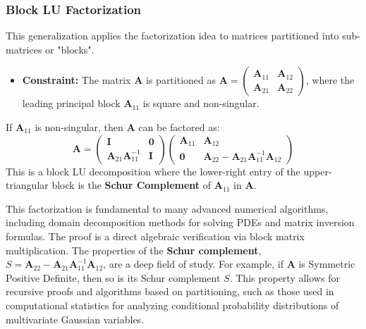 \subsubsection{Block LU Factorization}
This generalization applies the factorization idea to matrices partitioned into sub-matrices or "blocks".

\begin{itemize}
    \item \textbf{Constraint:} The matrix $\mathbf{A}$ is partitioned as $\mathbf{A} = \begin{pmatrix} \mathbf{A}_{11} & \mathbf{A}_{12} \\ \mathbf{A}_{21} & \mathbf{A}_{22} \end{pmatrix}$, where the leading principal block $\mathbf{A}_{11}$ is square and non-singular.
\end{itemize}

\begin{theorem}
If $\mathbf{A}_{11}$ is non-singular, then $\mathbf{A}$ can be factored as:
\[ \mathbf{A} = 
\begin{pmatrix} \mathbf{I} & \mathbf{0} \\ \mathbf{A}_{21}\mathbf{A}_{11}^{-1} & \mathbf{I} \end{pmatrix}
\begin{pmatrix} \mathbf{A}_{11} & \mathbf{A}_{12} \\ \mathbf{0} & \mathbf{A}_{22} - \mathbf{A}_{21}\mathbf{A}_{11}^{-1}\mathbf{A}_{12} \end{pmatrix}
\]
This is a block LU decomposition where the lower-right entry of the upper-triangular block is the \textbf{Schur Complement} of $\mathbf{A}_{11}$ in $\mathbf{A}$.
\end{theorem}

\begin{remark}
This factorization is fundamental to many advanced numerical algorithms, including domain decomposition methods for solving PDEs and matrix inversion formulas. The proof is a direct algebraic verification via block matrix multiplication. The properties of the \textbf{Schur complement}, $S = \mathbf{A}_{22} - \mathbf{A}_{21}\mathbf{A}_{11}^{-1}\mathbf{A}_{12}$, are a deep field of study. For example, if $\mathbf{A}$ is Symmetric Positive Definite, then so is its Schur complement $S$. This property allows for recursive proofs and algorithms based on partitioning, such as those used in computational statistics for analyzing conditional probability distributions of multivariate Gaussian variables.
\end{remark}

